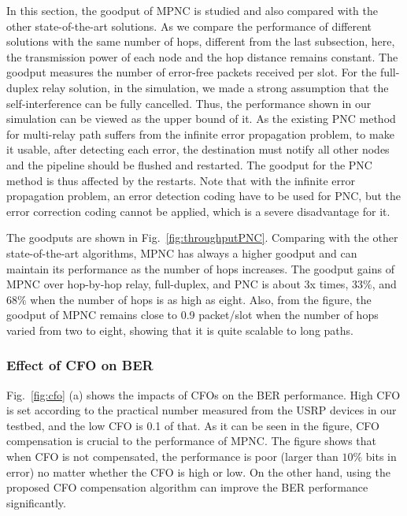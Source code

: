 In this section, the goodput of MPNC is studied and also compared with the other state-of-the-art solutions. As we compare the performance of different solutions with the same number of hops, different from the last subsection, here, the transmission power of each node and the hop distance remains constant. %
The goodput measures the number of error-free packets received per slot.
For the full-duplex relay solution, in the simulation, we made a strong assumption that the self-interference can be fully cancelled. Thus, the performance shown in our simulation can be viewed as the upper bound of it. 
As the existing PNC method for multi-relay path suffers from the infinite error propagation problem, to make it usable, after detecting each error, the destination must  notify all other nodes and the pipeline should be   flushed and restarted. The goodput for the PNC method is thus affected by the restarts.
Note that with the infinite error propagation problem, an error detection coding have to be used for PNC, but the error correction coding cannot be applied, which is a severe disadvantage for it. 
 


The goodputs  are shown in Fig.~\ref{fig:throughputPNC}. Comparing with the other state-of-the-art algorithms, MPNC has always a higher goodput and can maintain its performance as the number of hops increases. The goodput gains of MPNC over hop-by-hop relay, full-duplex, and PNC is about 3x times, $33\%$, and $68\%$ when the number of hops is as high as eight. Also, from the figure, the goodput of MPNC remains close to 0.9 packet/slot when the number of hops varied from two to eight, showing that it is quite scalable to long paths. 



\subsubsection{Effect of CFO on BER} %
\label{sub:effect_cfo_on_ber}
Fig.~\ref{fig:cfo} (a) shows the impacts of CFOs on the BER performance.
 High CFO is set according to the practical number measured from the USRP devices in our testbed, and the low CFO is 0.1 of that. As it can be seen in the figure, CFO compensation is crucial to the performance of MPNC. The figure shows that when CFO is not compensated, the performance is poor (larger than $10\%$ bits in error) no matter whether the CFO is high or low. On the other hand, using the proposed CFO compensation algorithm can improve the BER performance significantly.

